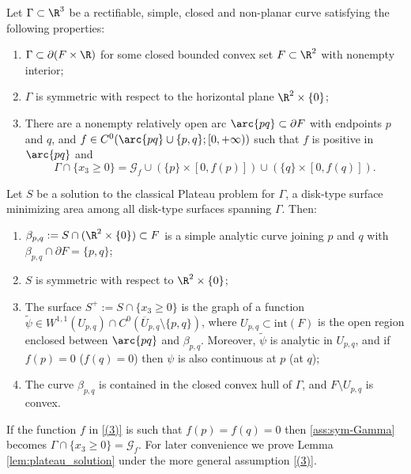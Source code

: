 \begin{lemma}\label{lem:plateau_solution}
Let $\Gamma \subset \R^3$
be a rectifiable, simple, closed and non-planar
curve satisfying the following properties:
\begin{enumerate}[label=$(\arabic*)$,wide]
\item \label{(1)}$\Gamma\subset\partial(F\times\R)$ for some closed bounded convex set $F\subset\R^2$ with nonempty interior;
\item \label{(2)}$\Gamma$ is symmetric with respect to the horizontal plane $\R^2\times\{0\}$;
\item \label{(3)} There are a nonempty
relatively open arc $\arc{pq}\subset\partial F$ with endpoints $p$ and $q$, and
$f\in C^0( \arc{pq}\cup\{p,q\};[0,+\infty))$ such that $f$ is positive in $\arc{pq}$ and
\begin{equation}\label{ass:sym-Gamma}
\Gamma\cap\{x_3\ge0\}=\mathcal{G}_f\cup (\{p\}\times[0,f(p)])\cup (\{q\}\times[0,f(q)]).
\end{equation}
\end{enumerate}
Let $S$ be a solution to the
classical Plateau problem for $\Gamma$, \ie a disk-type surface
minimizing area among all disk-type surfaces spanning $\Gamma$.
Then:
\begin{enumerate}[label=$(\arabic*')$,wide]
\item \label{1'}$\beta_{p,q}:=S\cap (\R^2\times\{0\})\subset F$
is a simple analytic curve joining $p$ and $q$ with $\beta_{p,q}\cap\partial F=\{p,q\}$;
\item\label{2'} $S$ is symmetric with respect to $\R^2\times\{0\}$;
\item \label{3'}The surface $S^+:=S\cap\{x_3\ge0\}$ is the graph of a
function { $\widetilde \psi\in W^{1,1}(U_{p,q})\cap C^0(\overline{U}_{p,q}\setminus{\{p,q\}})$}, where $U_{p,q}\subset\mathrm{int} (F)$ is the open region enclosed between $\arc{pq}$ and $\beta_{p,q}$. Moreover, $\widetilde\psi$ is analytic in $U_{p,q}$, { and if $f(p)=0$ (\resp $f(q)=0$) then $\psi$ is also continuous at $p$ (\resp at $q$);}
\item \label{4'}The curve $\beta_{p,q}$ is contained in the closed
convex hull of $\Gamma$, and $F\setminus U_{p,q}$ is convex.
\end{enumerate}
\end{lemma}

\begin{remark}
If the function $f$ in \ref{(3)} is such that $f(p)=f(q)=0$ then \eqref{ass:sym-Gamma} becomes $\Gamma\cap\{x_3\ge0\}=\mathcal{G}_f$.
For later convenience we prove Lemma \ref{lem:plateau_solution} under the more general assumption \ref{(3)}.
\end{remark}

